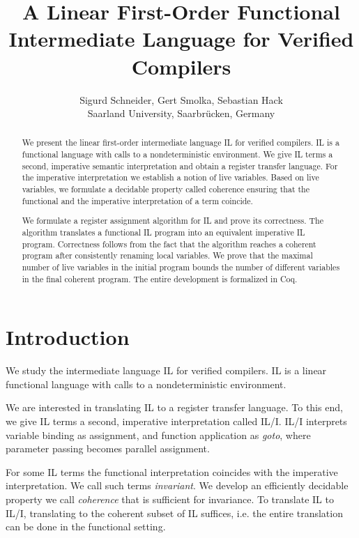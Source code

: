 \documentclass[openright,a4paper,11pt]{scrartcl}
\theoremstyle{plain}
\theoremstyle{plain}
\theoremstyle{plain}
\theoremstyle{plain}
\theoremstyle{nonumberplain}
\begin{document}
\renewcommand{\sectionautorefname}{Section}
\renewcommand{\subsectionautorefname}{Subsection}
\pagestyle{headings}  \title{A Linear First-Order Functional \\ Intermediate Language for Verified Compilers}
\author{Sigurd Schneider, Gert Smolka, Sebastian Hack\\[3mm]\small
Saarland University, Saarbrücken, Germany
}

\maketitle
\begin{abstract}
We present the linear first-order intermediate language IL for verified compilers.
IL is a functional language with calls to a nondeterministic environment.
We give IL terms a second, imperative semantic interpretation
and obtain a register transfer language.
For the imperative interpretation we establish a notion of live variables.
Based on live variables, we formulate a decidable property called coherence
ensuring that the functional and the imperative interpretation of a term coincide.

We formulate a register assignment algorithm for IL and prove its correctness.
The algorithm translates a functional IL program into an equivalent imperative IL program.
Correctness follows from the fact that the algorithm reaches a coherent program after consistently renaming local variables.
We prove that the maximal number of live variables in the initial program bounds the number of different variables in the final coherent program.
The entire development is formalized in Coq.
\end{abstract}

 \section{Introduction}
We study the intermediate language IL for verified compilers.
IL is a linear functional language with calls to a nondeterministic environment.

We are interested in translating IL to a register transfer language.
To this end, we give IL terms a second, imperative interpretation called IL/I.
IL/I interprets variable binding as assignment, and function application as \emph{goto},
where parameter passing becomes parallel assignment.

For some IL terms the functional interpretation coincides with the imperative interpretation.
We call such terms \emph{invariant}.
We develop an efficiently decidable property we call \emph{coherence} that is sufficient for invariance.
To translate IL to IL/I, translating to the coherent subset of IL suffices, i.e.
the entire translation can be done in the functional setting.
\end{document}
